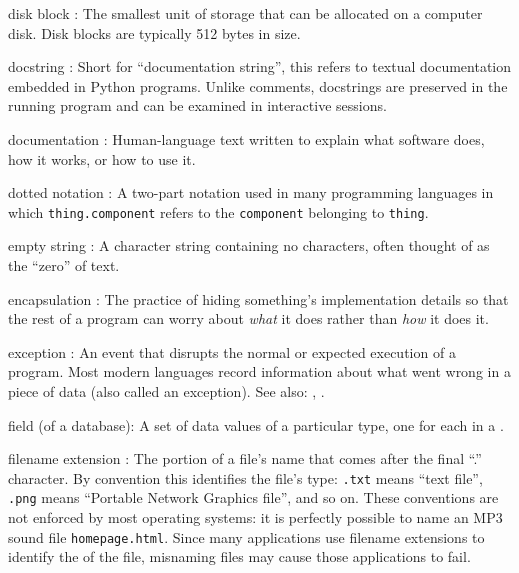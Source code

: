 \documentclass{book}
\begin{document}
\begin{swcdescription}
\item[disk block]:
The smallest unit of storage that can be allocated
on a computer disk. Disk blocks are typically 512 bytes in size.

\item[docstring]:
Short for ``documentation string'', this refers to
textual documentation embedded in Python programs. Unlike comments,
docstrings are preserved in the running program and can be examined in
interactive sessions.

\item[documentation]:
Human-language text written to explain what
software does, how it works, or how to use it.

\item[dotted notation]:
A two-part notation used in many programming
languages in which \texttt{thing.component} refers to the
\texttt{component} belonging to \texttt{thing}.

\item[empty string]:
A character string containing no characters,
often thought of as the ``zero'' of text.

\item[encapsulation]:
The practice of hiding something's
implementation details so that the rest of a program can worry about
\emph{what} it does rather than \emph{how} it does it.

\item[exception]:
An event that disrupts the normal or expected execution of a program.
Most modern languages record information about what went wrong
in a piece of data (also called an exception).
See also: , .

\item[field] (of a database):
A set of data values of a particular
type, one for each  in a
.

\item[filename extension]:
The portion of a file's name that comes
after the final ``.'' character. By convention this identifies the
file's type: \texttt{.txt} means ``text file'', \texttt{.png} means
``Portable Network Graphics file'', and so on. These conventions are not
enforced by most operating systems: it is perfectly possible to name an
MP3 sound file \texttt{homepage.html}. Since many applications use
filename extensions to identify the  of
the file, misnaming files may cause those applications to fail.


\end{swcdescription}
\end{document}
